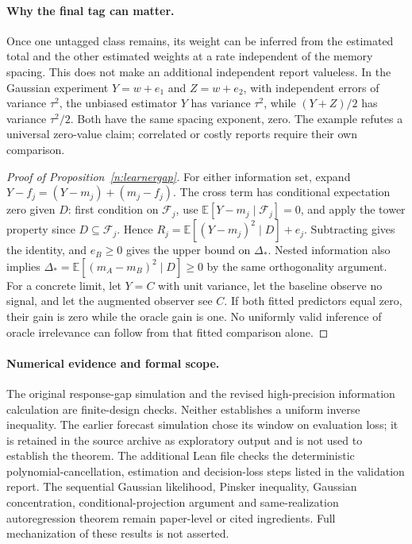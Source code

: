 \documentclass[12pt]{article}
\theoremstyle{definition}
\theoremstyle{remark}
\begin{document}
\paragraph{Why the final tag can matter.} Once one untagged class remains, its weight can be inferred from the estimated total and the other estimated weights at a rate independent of the memory spacing. This does not make an additional independent report valueless. In the Gaussian experiment $Y=w+e_1$ and $Z=w+e_2$, with independent errors of variance $\tau^2$, the unbiased estimator $Y$ has variance $\tau^2$, while $(Y+Z)/2$ has variance $\tau^2/2$. Both have the same spacing exponent, zero. The example refutes a universal zero-value claim; correlated or costly reports require their own comparison.

\begin{proof}[Proof of Proposition~\ref{n:learnergap}]
For either information set, expand $Y-f_j=(Y-m_j)+(m_j-f_j)$. The cross term has conditional expectation zero given $D$: first condition on $\mathcal F_j$, use $\mathbb E[Y-m_j\mid\mathcal F_j]=0$, and apply the tower property since $D\subseteq\mathcal F_j$. Hence $R_j=\mathbb E[(Y-m_j)^2\mid D]+e_j$. Subtracting gives the identity, and $e_B\ge0$ gives the upper bound on $\Delta_*$. Nested information also implies $\Delta_*=\mathbb E[(m_A-m_B)^2\mid D]\ge0$ by the same orthogonality argument. For a concrete limit, let $Y=C$ with unit variance, let the baseline observe no signal, and let the augmented observer see $C$. If both fitted predictors equal zero, their gain is zero while the oracle gain is one. No uniformly valid inference of oracle irrelevance can follow from that fitted comparison alone.
\end{proof}

\paragraph{Numerical evidence and formal scope.} The original response-gap simulation and the revised high-precision information calculation are finite-design checks. Neither establishes a uniform inverse inequality. The earlier forecast simulation chose its window on evaluation loss; it is retained in the source archive as exploratory output and is not used to establish the theorem. The additional Lean file checks the deterministic polynomial-cancellation, estimation and decision-loss steps listed in the validation report. The sequential Gaussian likelihood, Pinsker inequality, Gaussian concentration, conditional-projection argument and same-realization autoregression theorem remain paper-level or cited ingredients. Full mechanization of these results is not asserted.
\end{document}

